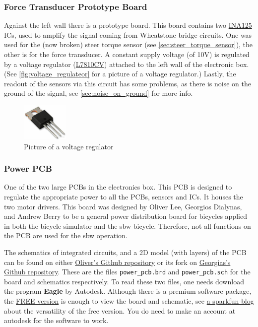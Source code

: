 \subsubsection{Force Transducer Prototype Board}
Against the left wall there is a prototype board.
This board contains two \href{https://www.ti.com/lit/ds/symlink/ina125.pdf}{INA125} ICs, used to amplify the signal coming from Wheatstone bridge circuits.
One was used for the (now broken) steer torque sensor (see \autoref{sec:steer_torque_sensor}), the other is for the force transducer.
A constant supply voltage (of 10V) is regulated by a voltage regulator (\href{https://www.digikey.com/en/products/detail/stmicroelectronics/l7810cv/1038259}{L7810CV}) attached to the left wall of the electronic box. 
(See \autoref{fig:voltage_regulateor} for a picture of a voltage regulator.)
Lastly, the readout of the sensors via this circuit has some problems, as there is noise on the ground of the signal, see \autoref{sec:noise_on_ground} for more info.
\begin{figure}
    \centering
    \includegraphics[width=0.2\textwidth]{Img/voltage_regulator.jpg}
    \caption{Picture of a voltage regulator}
    \label{fig:voltage_regulateor}
\end{figure}

\subsubsection{Power PCB}
One of the two large PCBs in the electronics box.
This PCB is designed to regulate the appropriate power to all the PCBs, sensors and ICs.
It houses the two motor drivers.
This board was designed by Oliver Lee, Georgios Dialynas, and Andrew Berry to be a general power distribution board for bicycles applied in both the bicycle simulator and the sbw bicycle. Therefore, not all functions on the PCB are used for the sbw operation.

The schematics of integrated circuits, and a 2D model (with layers) of the PCB can be found on either \href{https://github.com/oliverlee/gyropcb}{Oliver's Github repository} or its fork on \href{https://github.com/gdialynas/gyropcb}{Georgias's Github repository}.
These are the files \texttt{power\_pcb.brd} and \texttt{power\_pcb.sch} for the board and schematics respectively.
To read these two files, one needs download the program \textbf{Eagle} by Autodesk.
Although there is a premium software package, the \href{https://www.autodesk.com/products/eagle/free-download}{FREE version} is enough to view the board and schematic, see \href{https://learn.sparkfun.com/tutorials/how-to-install-and-setup-eagle/all}{a sparkfun blog} about the versatility of the free version.
You do need to make an account at autodesk for the software to work.

